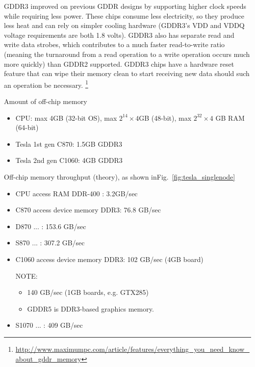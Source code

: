 GDDR3 improved on previous GDDR designs by supporting higher clock speeds while
requiring less power. These chips consume less electricity, so they produce less
heat and can rely on simpler cooling hardware (GDDR3's VDD and VDDQ voltage
requirements are both 1.8 volts). GDDR3 also has separate read and write data
strobes, which contributes to a much faster read-to-write ratio (meaning the
turnaround from a read operation to a write operation occurs much more quickly)
than GDDR2 supported. GDDR3 chips have a hardware reset feature that can wipe
their memory clean to start receiving new data should such an operation be
necessary.
\footnote{\url{http://www.maximumpc.com/article/features/everything_you_need_know_about_gddr_memory}}

Amount of off-chip memory

\begin{itemize}
  \item CPU: max 4GB (32-bit OS), max $2^{14}\times 4$GB (48-bit), max
    $2^{32}\times 4$ GB RAM (64-bit)

  \item Tesla 1st gen C870: 1.5GB GDDR3

  \item Tesla 2nd gen C1060: 4GB GDDR3
\end{itemize}

Off-chip memory throughput (theory), as shown inFig.~\ref{fig:tesla_singlenode}

\begin{itemize}
  \item CPU access RAM DDR-400 : 3.2GB/sec
  \item C870 access device memory DDR3: 76.8 GB/sec
  \item D870 ... : 153.6 GB/sec
  \item S870 ... : 307.2 GB/sec
  \item C1060 access device memory DDR3: 102 GB/sec (4GB board)

    \begin{framed}
      NOTE:
      \begin{itemize}
      \item  140 GB/sec (1GB boards, e.g. GTX285)
      \item GDDR5 is DDR3-based graphics memory.
      \end{itemize}

    \end{framed}
  \item S1070 ... : 409 GB/sec
\end{itemize}

